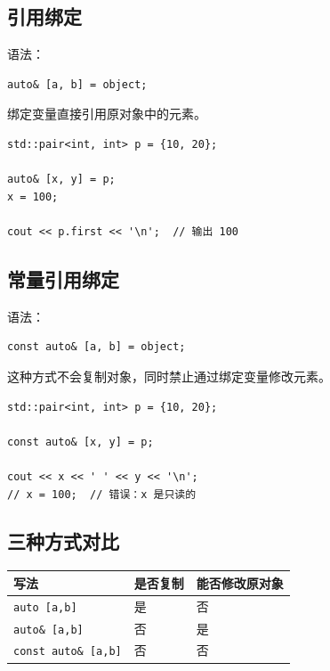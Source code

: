 \documentclass[UTF8,12pt,a4paper]{ctexart}
\begin{document}
\subsection{引用绑定}

语法：

\begin{lstlisting}
auto& [a, b] = object;
\end{lstlisting}

绑定变量直接引用原对象中的元素。

\begin{lstlisting}
std::pair<int, int> p = {10, 20};

auto& [x, y] = p;
x = 100;

cout << p.first << '\n';  // 输出 100
\end{lstlisting}

\subsection{常量引用绑定}

语法：

\begin{lstlisting}
const auto& [a, b] = object;
\end{lstlisting}

这种方式不会复制对象，同时禁止通过绑定变量修改元素。

\begin{lstlisting}
std::pair<int, int> p = {10, 20};

const auto& [x, y] = p;

cout << x << ' ' << y << '\n';
// x = 100;  // 错误：x 是只读的
\end{lstlisting}

\subsection{三种方式对比}

\begin{center}
\begin{tabular}{lll}
\toprule
写法 & 是否复制 & 能否修改原对象 \\
\midrule
\texttt{auto [a,b]} & 是 & 否 \\
\texttt{auto\& [a,b]} & 否 & 是 \\
\texttt{const auto\& [a,b]} & 否 & 否 \\
\bottomrule
\end{tabular}
\end{center}
\end{document}
